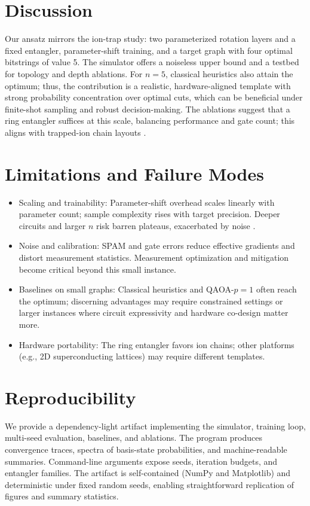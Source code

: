 \section{Discussion}
Our ansatz mirrors the ion-trap study: two parameterized rotation layers and a fixed entangler, parameter-shift training, and a target graph with four optimal bitstrings of value 5. The simulator offers a noiseless upper bound and a testbed for topology and depth ablations. For $n{=}5$, classical heuristics also attain the optimum; thus, the contribution is a realistic, hardware-aligned template with strong probability concentration over optimal cuts, which can be beneficial under finite-shot sampling and robust decision-making. The ablations suggest that a ring entangler suffices at this scale, balancing performance and gate count; this aligns with trapped-ion chain layouts \cite{bruzewicz2019trappedion,wright2019benchmarking}.

\section{Limitations and Failure Modes}
\begin{itemize}
    \item Scaling and trainability: Parameter-shift overhead scales linearly with parameter count; sample complexity rises with target precision. Deeper circuits and larger $n$ risk barren plateaus, exacerbated by noise \cite{mcclean2018barren,wang2021noiseplateaus}.
    \item Noise and calibration: SPAM and gate errors reduce effective gradients and distort measurement statistics. Measurement optimization and mitigation \cite{huggins2021efficient,verteletskyi2020measurement} become critical beyond this small instance.
    \item Baselines on small graphs: Classical heuristics and QAOA-$p{=}1$ often reach the optimum; discerning advantages may require constrained settings or larger instances where circuit expressivity and hardware co-design matter more.
    \item Hardware portability: The ring entangler favors ion chains; other platforms (e.g., 2D superconducting lattices) may require different templates.
\end{itemize}

\section{Reproducibility}
We provide a dependency-light artifact implementing the simulator, training loop, multi-seed evaluation, baselines, and ablations. The program produces convergence traces, spectra of basis-state probabilities, and machine-readable summaries. Command-line arguments expose seeds, iteration budgets, and entangler families. The artifact is self-contained (NumPy and Matplotlib) and deterministic under fixed random seeds, enabling straightforward replication of figures and summary statistics.

